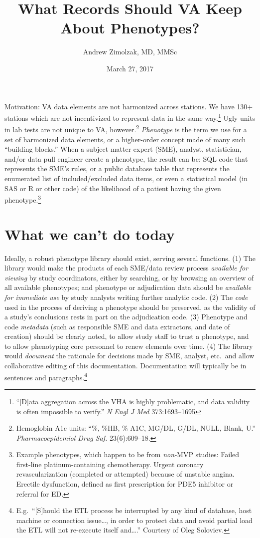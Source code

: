 \documentclass{tufte-handout}
\title{What Records Should VA Keep About Phenotypes?}
\author{Andrew Zimolzak, MD, MMSc}
\date{March 27, 2017}
\begin{document}
\maketitle

Motivation: VA data elements are not harmonized across stations. We
have 130+ stations which are not incentivized to represent data in the
same way.\footnote{``[D]ata aggregation across the VHA is highly
  problematic, and data validity is often impossible to verify.''
  \emph{N Engl J Med} 373:1693--1695} Ugly units in lab tests are not
unique to VA, however.\footnote{Hemoglobin A1c units: ``\%, \%HB, \%
  A1C, MG/DL, G/DL, NULL, Blank, U.'' \emph{Pharmacoepidemiol Drug
    Saf.} 23(6):609--18.} \emph{Phenotype} is the term we use for a
set of harmonized data elements, or a higher-order concept made of
many such ``building blocks.'' When a subject matter expert (SME),
analyst, statistician, and/or data pull engineer create a phenotype,
the result can be: SQL code that represents the SME's rules, or a
public database table that represents the enumerated list of
included\slash excluded data items, or even a statistical model (in SAS or R
or other code) of the likelihood of a patient having the given
phenotype.\footnote{Example phenotypes, which happen to be from
  \emph{non-}MVP studies: Failed first-line platinum-containing
  chemotherapy. Urgent coronary revascularization (completed or
  attempted) because of unstable angina. Erectile dysfunction, defined
  as first prescription for PDE5 inhibitor or referral for ED.}

\section{What we can't do today}

Ideally, a robust phenotype library should exist, serving several
functions. (1) The library would make the products of each SME/data
review process \emph{available for viewing} by study coordinators,
either by searching, or by browsing an overview of all available
phenotypes; and phenotype or adjudication data should be
\emph{available for immediate use} by study analysts writing further
analytic code. (2) The \emph{code} used in the process of deriving a
phenotype should be preserved, as the validity of a study's
conclusions rests in part on the adjudication code. (3) Phenotype and
code \emph{metadata} (such as responsible SME and data extractors, and
date of creation) should be clearly noted, to allow study staff to
trust a phenotype, and to allow phenotyping core personnel to renew
elements over time. (4) The library would \emph{document} the
rationale for decisions made by SME, analyst, etc.\ and allow
collaborative editing of this documentation. Documentation will
typically be in sentences and paragraphs.\footnote{E.g.\ ``[S]hould
  the ETL process be interrupted by any kind of database, host machine
  or connection issue\ldots{}, in order to protect data and avoid
  partial load the ETL will not re-execute itself and\ldots{}.'' Courtesy
  of Oleg Soloviev.}
\end{document}
